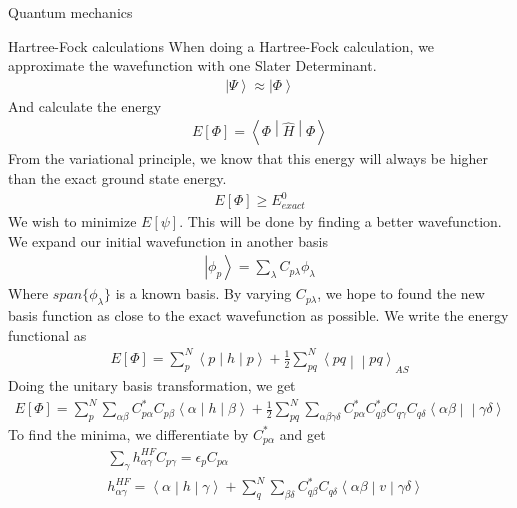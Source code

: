 \documentclass[a4paper, 12pt, titlepage]{article}
\begin{document}
\begin{section}{Quantum mechanics}
\begin{subsection}{Hartree-Fock calculations}
	When doing a Hartree-Fock calculation, we approximate the wavefunction with one Slater Determinant. 
 	\begin{align*}
 		\left| \Psi \right> \approx \left| \Phi \right>
 	\end{align*}
 	And calculate the energy
 	\begin{align*}
 		E[\Phi] = \left< \Phi \middle| \hat H \middle| \Phi \right> 
 	\end{align*}
 	From the variational principle, we know that this energy will always be higher than the exact ground state energy. 
 	\begin{align*}
 		E[\Phi] \geq E_{exact}^0
 	\end{align*}
 	We wish to minimize $E[\psi]$. This will be done by finding a better wavefunction. We expand our initial wavefunction in another basis
 	\begin{align*}
 		\left| \phi_p \right> = \sum_\lambda C_{p \lambda} \phi_ \lambda
 	\end{align*}
 	Where $span\{\phi_ \lambda\}$ is a known basis. By varying $C_{p \lambda}$, we hope to found the new basis function as close to the exact wavefunction as possible. We write the energy functional as 
 	\begin{align*}
 		E[\Phi] = \sum_p^N \left< p \middle| h \middle| p \right> + \frac{1}{2} \sum_{pq}^N \left< p q \middle|\middle| p q \right>_{AS}
 	\end{align*}
 	Doing the unitary basis transformation, we get 
 	\begin{align*}
 		E[\Phi] = \sum_p^N \sum_{\alpha \beta } C_{p \alpha}^* C_{p \beta} \left< \alpha \middle| h \middle| \beta \right> + 
 		\frac{1}{2} \sum_{pq}^N \sum_{\alpha \beta \gamma \delta } C_{p \alpha}^* C_{q \beta}^* C_{q \gamma} C_{q \delta} \left< \alpha \beta \middle|\middle| \gamma \delta \right> 	
 	\end{align*}
 	To find the minima, we differentiate by $C_{p \alpha} ^*$ and get
 	\begin{align*}
 		&\sum_ \gamma h_ {\alpha \gamma}^{HF} C_{p \gamma} = \epsilon_p C_{p \alpha} \\
 		&h_{ \alpha \gamma} ^{HF} = \left< \alpha \middle| h \middle| \gamma \right> + \sum_q^N \sum_{ \beta \delta } C_{q \beta}^* C_ {q \delta} \left< \alpha \beta \middle| v \middle| \gamma \delta \right> 
 	\end{align*}
 \end{subsection}

\end{section}
\newpage
\end{document}

